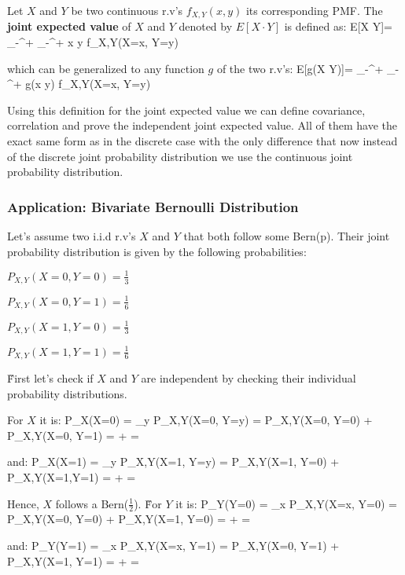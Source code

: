 Let $X$ and $Y$ be two continuous r.v's $f_{X,Y}(x,y)$ its corresponding PMF. The \textbf{joint expected value} of
$X$ and $Y$ denoted by $E[X \cdot Y]$ is defined as:
\bse
E[X \cdot Y]= \int_{-\infty}^{+\infty} \int_{-\infty}^{+\infty} x \cdot y \cdot f_{X,Y}(X=x, Y=y)
\ese
\ed

which can be generalized to any function $g$ of the two r.v's:
\bse
E[g(X \cdot Y)]= \int_{-\infty}^{+\infty} \int_{-\infty}^{+\infty} g(x \cdot y) \cdot f_{X,Y}(X=x, Y=y)
\ese

Using this definition for the joint expected value we can define covariance, correlation and prove the independent
joint expected value. All of them have the exact same form as in the discrete case with the only difference that now
instead of the discrete joint probability distribution we use the continuous joint probability distribution.

\subsubsection*{Application: Bivariate Bernoulli Distribution}

Let's assume two i.i.d r.v's $X$ and $Y$ that both follow some Bern(p). Their joint probability distribution is given
by the following probabilities:
\bit
\item $P_{X,Y}(X=0, Y=0) = \frac{1}{3}$
\item $P_{X,Y}(X=0, Y=1) = \frac{1}{6}$
\item $P_{X,Y}(X=1, Y=0) = \frac{1}{3}$
\item $P_{X,Y}(X=1, Y=1) = \frac{1}{6}$
\eit

\v

First let's check if $X$ and $Y$ are independent by checking their individual probability distributions.

For $X$ it is:
\bse
P_{X}(X=0) = \sum_{y} P_{X,Y}(X=0, Y=y) = P_{X,Y}(X=0, Y=0) + P_{X,Y}(X=0, Y=1) =  +  = 
\ese

and:
\bse
P_{X}(X=1) = \sum_{y} P_{X,Y}(X=1, Y=y) = P_{X,Y}(X=1, Y=0) + P_{X,Y}(X=1,Y=1) =  +  = 
\ese

Hence, $X$ follows a Bern\Big($\frac{1}{2}$\Big). \v

For $Y$ it is:
\bse
P_{Y}(Y=0) = \sum_{x} P_{X,Y}(X=x, Y=0) = P_{X,Y}(X=0, Y=0) + P_{X,Y}(X=1, Y=0) =  +  = 
\ese

and:
\bse
P_{Y}(Y=1) = \sum_{x} P_{X,Y}(X=x, Y=1) = P_{X,Y}(X=0, Y=1) + P_{X,Y}(X=1, Y=1) =  +  = 
\ese

